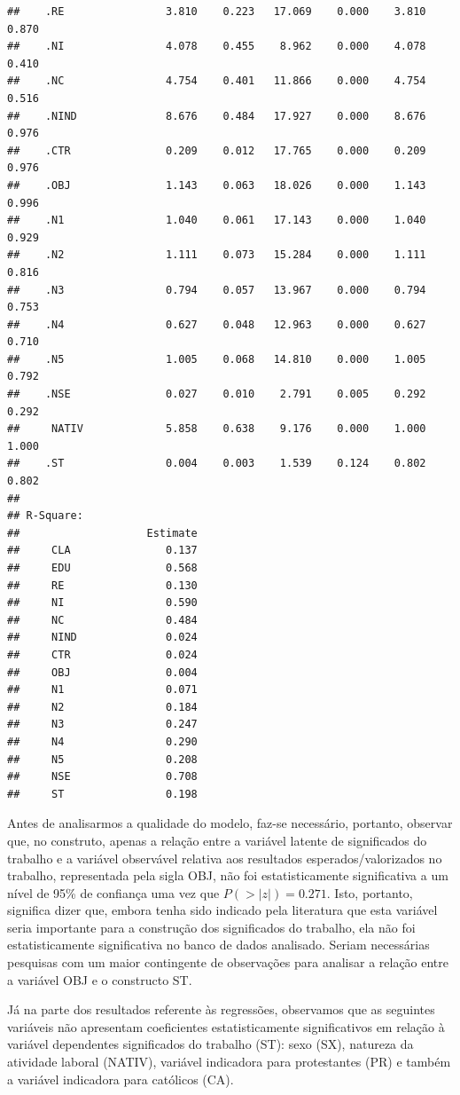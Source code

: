 \documentclass[
  12pt,
]{article}
\begin{document}
\begin{verbatim}
##    .RE                3.810    0.223   17.069    0.000    3.810    0.870
##    .NI                4.078    0.455    8.962    0.000    4.078    0.410
##    .NC                4.754    0.401   11.866    0.000    4.754    0.516
##    .NIND              8.676    0.484   17.927    0.000    8.676    0.976
##    .CTR               0.209    0.012   17.765    0.000    0.209    0.976
##    .OBJ               1.143    0.063   18.026    0.000    1.143    0.996
##    .N1                1.040    0.061   17.143    0.000    1.040    0.929
##    .N2                1.111    0.073   15.284    0.000    1.111    0.816
##    .N3                0.794    0.057   13.967    0.000    0.794    0.753
##    .N4                0.627    0.048   12.963    0.000    0.627    0.710
##    .N5                1.005    0.068   14.810    0.000    1.005    0.792
##    .NSE               0.027    0.010    2.791    0.005    0.292    0.292
##     NATIV             5.858    0.638    9.176    0.000    1.000    1.000
##    .ST                0.004    0.003    1.539    0.124    0.802    0.802
## 
## R-Square:
##                    Estimate
##     CLA               0.137
##     EDU               0.568
##     RE                0.130
##     NI                0.590
##     NC                0.484
##     NIND              0.024
##     CTR               0.024
##     OBJ               0.004
##     N1                0.071
##     N2                0.184
##     N3                0.247
##     N4                0.290
##     N5                0.208
##     NSE               0.708
##     ST                0.198
\end{verbatim}

\normalsize
\onehalfspacing

Antes de analisarmos a qualidade do modelo, faz-se necessário, portanto,
observar que, no construto, apenas a relação entre a variável latente de
significados do trabalho e a variável observável relativa aos resultados
esperados/valorizados no trabalho, representada pela sigla OBJ, não foi
estatisticamente significativa a um nível de 95\% de confiança uma vez
que \(P(>|z|) = 0.271\). Isto, portanto, significa dizer que, embora
tenha sido indicado pela literatura que esta variável seria importante
para a construção dos significados do trabalho, ela não foi
estatisticamente significativa no banco de dados analisado. Seriam
necessárias pesquisas com um maior contingente de observações para
analisar a relação entre a variável OBJ e o constructo ST.

Já na parte dos resultados referente às regressões, observamos que as
seguintes variáveis não apresentam coeficientes estatisticamente
significativos em relação à variável dependentes significados do
trabalho (ST): sexo (SX), natureza da atividade laboral (NATIV),
variável indicadora para protestantes (PR) e também a variável
indicadora para católicos (CA).
\end{document}
